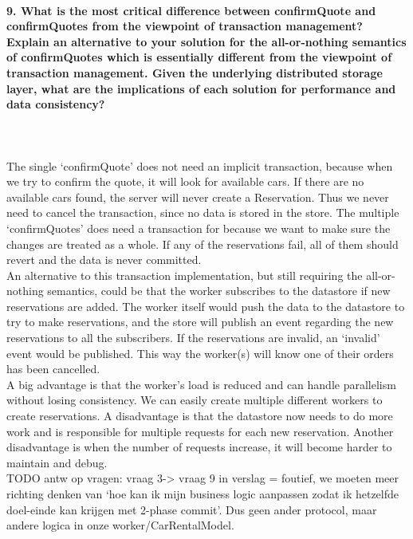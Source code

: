 \documentclass{ds-report}
\begin{document}
	\paragraph{9. What is the most critical difference between confirmQuote and confirmQuotes from the viewpoint of transaction management? Explain an alternative to your solution for the all-or-nothing semantics of confirmQuotes which is essentially different from the viewpoint of transaction management. Given the underlying distributed storage layer, what are the implications of each solution for performance and data consistency?} \mbox{}\\\\
	The single `confirmQuote' does not need an implicit transaction, because when we try to confirm the quote, it will look for available cars. If there are no available cars found, the server will never create a Reservation. Thus we never need to cancel the transaction, since no data is stored in the store.
	The multiple `confirmQuotes' does need a transaction for because we want to make sure the changes are treated as a whole. If any of the reservations fail, all of them should revert and the data is never committed. \\
	An alternative to this transaction implementation, but still requiring the all-or-nothing semantics, could be that the worker subscribes to the datastore if new reservations are added. The worker itself would push the data to the datastore to try to make reservations, and the store will publish an event regarding the new reservations to all the subscribers. If the reservations are invalid, an `invalid' event would be published. This way the worker(s) will know one of their orders has been cancelled.\\
	A big advantage is that the worker's load is reduced and can handle parallelism without losing consistency. We can easily create multiple different workers to create reservations. A disadvantage is that the datastore now needs to do more work and is responsible for multiple requests for each new reservation. Another disadvantage is when the number of requests increase, it will become harder to maintain and debug. \\

	
	TODO antw op vragen: vraag 3-> vraag 9 in verslag = foutief, we moeten meer richting denken van `hoe kan ik mijn business logic aanpassen zodat ik hetzelfde doel-einde kan krijgen met 2-phase commit'. Dus geen ander protocol, maar andere logica in onze worker/CarRentalModel. \\
	
\end{document}
